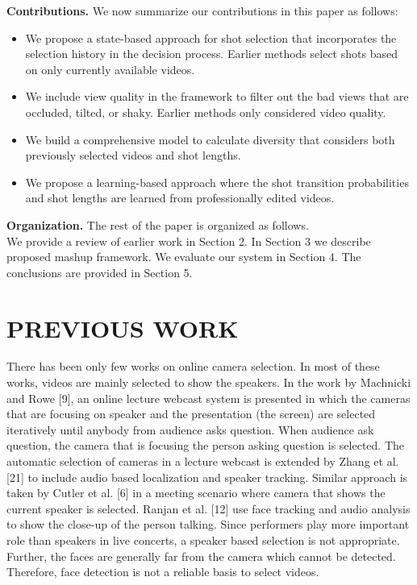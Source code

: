 \documentclass{sig-alternate-05-2015}
\begin{document}
\textbf{Contributions.}
We now summarize our contributions in this paper
as follows:
\begin{itemize}
\item We propose a state-based approach for shot selection that incorporates the selection history in the decision process. Earlier methods select shots based on only currently available videos.
\item We include view quality in the framework to filter out the bad views that are occluded, tilted, or shaky. Earlier methods only considered video quality.
\item We build a comprehensive model to calculate diversity that considers both previously selected videos and shot lengths.
\item We propose a learning-based approach where the shot transition probabilities and shot lengths are learned from professionally edited videos.
\end{itemize}

\textbf{Organization.}
The rest of the paper is organized as follows.\\
We provide a review of earlier work in Section 2. In Section 3 we describe proposed mashup framework. We evaluate our system in Section 4. The conclusions are provided in Section 5.

\section{PREVIOUS WORK}
There has been only few works on online camera selection. In
most of these works, videos are mainly selected to show the speakers.
In the work by Machnicki and Rowe [9], an online lecture
webcast system is presented in which the cameras that are focusing
on speaker and the presentation (the screen) are selected iteratively
until anybody from audience asks question. When audience ask
question, the camera that is focusing the person asking question is
selected. The automatic selection of cameras in a lecture webcast
is extended by Zhang et al. [21] to include audio based localization
and speaker tracking. Similar approach is taken by Cutler et al. [6]
in a meeting scenario where camera that shows the current speaker
is selected. Ranjan et al. [12] use face tracking and audio analysis
to show the close-up of the person talking. Since performers
play more important role than speakers in live concerts, a speaker
based selection is not appropriate. Further, the faces are generally
far from the camera which cannot be detected. Therefore, face detection
is not a reliable basis to select videos.
\end{document}

